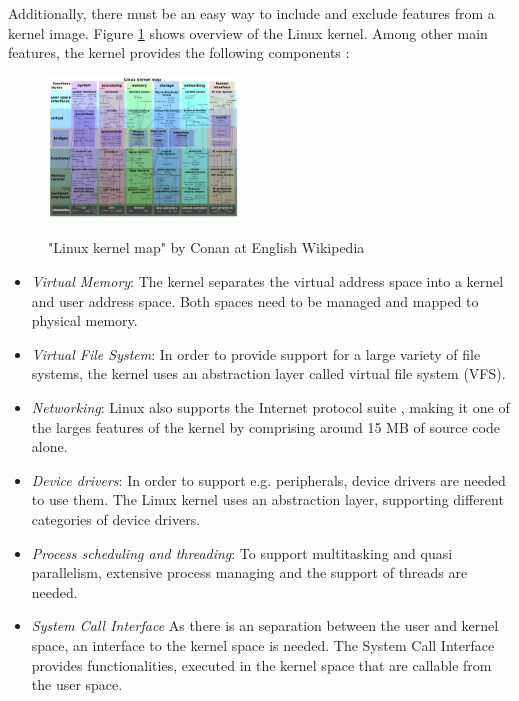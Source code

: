 \documentclass{sig-alternate-05-2015}
\begin{document}
Additionally, there must be an easy way to include and exclude features from a kernel image. 
Figure \ref{fig:kernelmap} shows overview of the Linux kernel. Among other main features, the kernel provides the following  components \cite{mauerer2010professional}:
\begin{figure}[h]
\centering
\includegraphics[width= 0.45\textwidth ]{img/Linux_kernel_map.png}
\label{fig:kernelmap}
\caption{"Linux kernel map" by Conan at English Wikipedia \cite{kernelmap}}
\end{figure}


\begin{itemize}
\item \emph{Virtual Memory}: The kernel separates the virtual address space into a kernel and user address space. Both spaces need to be managed and mapped to physical memory.
\item \emph{Virtual File System}: In order to provide support for a large variety of file systems, the kernel uses an abstraction layer called virtual file system (VFS).
\item \emph{Networking}: Linux also supports the  Internet protocol suite \cite{almquist1992type}, making it one of the larges features of the kernel by comprising around 15 MB of source code alone.
\item \emph{Device drivers}: In order to  support e.g. peripherals, device drivers are needed to use them. The Linux kernel uses an abstraction layer, supporting different categories of device drivers.
\item \emph{Process scheduling and threading}: To support multitasking and quasi parallelism, extensive process managing and the support of threads are needed.
\item \emph{System Call Interface} As there is an separation between the user and kernel space, an interface to the kernel space is needed. The System Call Interface provides functionalities, executed in the kernel space that are callable from the user space.
\end{itemize}
\end{document}
